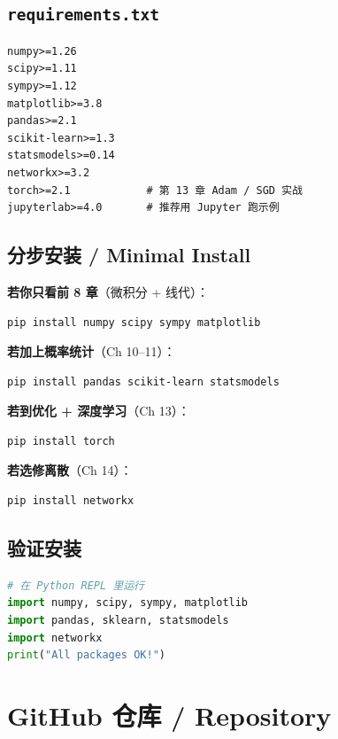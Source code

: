 \subsection{\texttt{requirements.txt}}

\begin{lstlisting}
numpy>=1.26
scipy>=1.11
sympy>=1.12
matplotlib>=3.8
pandas>=2.1
scikit-learn>=1.3
statsmodels>=0.14
networkx>=3.2
torch>=2.1            # 第 13 章 Adam / SGD 实战
jupyterlab>=4.0       # 推荐用 Jupyter 跑示例
\end{lstlisting}

\subsection{分步安装 / Minimal Install}

\textbf{若你只看前 8 章}（微积分 + 线代）：

\begin{lstlisting}[language=bash]
pip install numpy scipy sympy matplotlib
\end{lstlisting}

\textbf{若加上概率统计}（Ch 10--11）：

\begin{lstlisting}[language=bash]
pip install pandas scikit-learn statsmodels
\end{lstlisting}

\textbf{若到优化 + 深度学习}（Ch 13）：

\begin{lstlisting}[language=bash]
pip install torch
\end{lstlisting}

\textbf{若选修离散}（Ch 14）：

\begin{lstlisting}[language=bash]
pip install networkx
\end{lstlisting}

\subsection{验证安装}

\begin{lstlisting}[language=Python]
# 在 Python REPL 里运行
import numpy, scipy, sympy, matplotlib
import pandas, sklearn, statsmodels
import networkx
print("All packages OK!")
\end{lstlisting}

\section{GitHub 仓库 / Repository}

